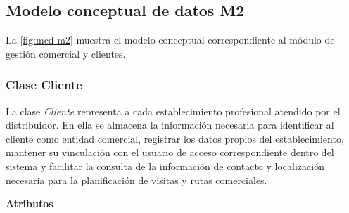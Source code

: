 \subsection{Modelo conceptual de datos M2}

La \autoref{fig:mcd-m2} muestra el modelo conceptual correspondiente al módulo de gestión comercial y clientes.


\subsubsection{Clase Cliente}

La clase \textit{Cliente} representa a cada establecimiento profesional atendido por el distribuidor. En ella se almacena la información necesaria para identificar al cliente como entidad comercial, registrar los datos propios del establecimiento, mantener su vinculación con el usuario de acceso correspondiente dentro del sistema y facilitar la consulta de la información de contacto y localización necesaria para la planificación de visitas y rutas comerciales.

\textbf{Atributos}

